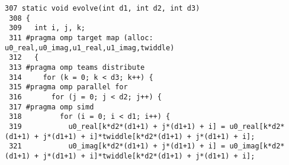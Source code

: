 \hspace{-10pt}
\begin{minipage}{1.15\textwidth}
\begin{lstlisting}[style=customcnonum,basicstyle=\scriptsize, frame=tlrb, caption={\textit{evolve} from NAS/ft.c}, label=nas-ft-1]
  307 static void evolve(int d1, int d2, int d3)
 308 {
 309   int i, j, k;
 311 #pragma omp target map (alloc: u0_real,u0_imag,u1_real,u1_imag,twiddle)
 312   {
 313 #pragma omp teams distribute
 314     for (k = 0; k < d3; k++) {
 315 #pragma omp parallel for
 316       for (j = 0; j < d2; j++) {
 317 #pragma omp simd
 318         for (i = 0; i < d1; i++) {
 319           u0_real[k*d2*(d1+1) + j*(d1+1) + i] = u0_real[k*d2*(d1+1) + j*(d1+1) + i]*twiddle[k*d2*(d1+1) + j*(d1+1) + i];
 321           u0_imag[k*d2*(d1+1) + j*(d1+1) + i] = u0_imag[k*d2*(d1+1) + j*(d1+1) + i]*twiddle[k*d2*(d1+1) + j*(d1+1) + i];
\end{lstlisting}
\end{minipage}  
% 
\vspace{-20pt}
